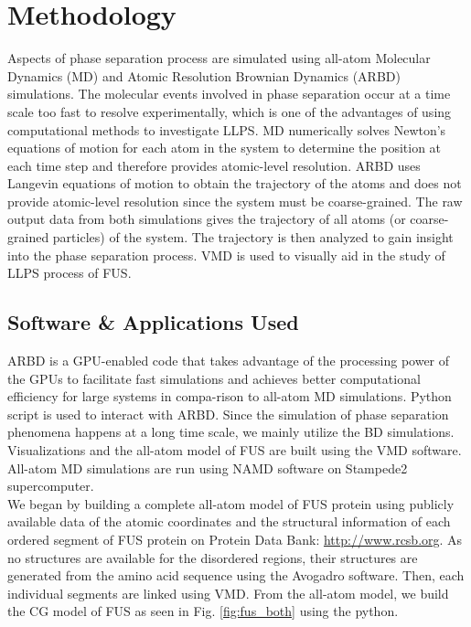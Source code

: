 \documentclass[12ptr]{article}
\begin{document}
\section{Methodology}
Aspects of phase separation process are simulated using all-atom Molecular Dynamics (MD) and Atomic Resolution Brownian Dynamics (ARBD) simulations. The molecular events involved in phase separation occur at a time scale too fast to resolve experimentally, which is one of the advantages of using computational methods to investigate LLPS. MD numerically solves Newton’s equations of motion for each atom in the system to determine the position at each time step and therefore provides atomic-level resolution. ARBD uses Langevin equations of motion to obtain the trajectory of the atoms and does not provide atomic-level resolution since the system must be coarse-grained. The raw output data from both simulations gives the trajectory of all atoms (or coarse-grained particles) of the system. The trajectory is then analyzed to gain insight into the phase separation process. VMD is used to visually aid in the study of LLPS process of FUS. 

\subsection{Software \& Applications Used}
ARBD is a GPU-enabled code that takes advantage of the processing power of the GPUs to facilitate fast simulations and achieves better computational efficiency for large systems in compa-rison to all-atom MD simulations. Python script is used to interact with ARBD. Since the simulation of phase separation phenomena happens at a long time scale, we mainly utilize the BD simulations.
Visualizations and the all-atom model of FUS are built using the VMD software.
All-atom MD simulations are run using NAMD software on Stampede2 supercomputer.\\

We began by building a complete all-atom model of FUS protein using publicly available data of the atomic coordinates and the structural information of each ordered segment of FUS protein on Protein Data Bank: \href {http://www.rcsb.org}{http://www.rcsb.org}. As no structures are available for the disordered regions, their structures are generated from the amino acid sequence using the Avogadro software. Then, each individual segments are linked using VMD. From the all-atom model, we build the CG model of FUS as seen in Fig. \ref{fig:fus_both} using the python. 
\end{document}
